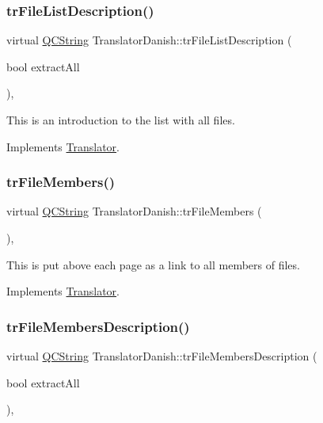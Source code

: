 \subsubsection{\texorpdfstring{trFileListDescription()}{trFileListDescription()}}
{\footnotesize\ttfamily virtual \mbox{\hyperlink{class_q_c_string}{Q\+C\+String}} Translator\+Danish\+::tr\+File\+List\+Description (\begin{DoxyParamCaption}\item[{bool}]{extract\+All }\end{DoxyParamCaption})\hspace{0.3cm}{\ttfamily [inline]}, {\ttfamily [virtual]}}

This is an introduction to the list with all files. 

Implements \mbox{\hyperlink{class_translator}{Translator}}.

\mbox{\label{class_translator_danish_a6a29a5d2185a56c12c9083d371adb616}} 
\subsubsection{\texorpdfstring{trFileMembers()}{trFileMembers()}}
{\footnotesize\ttfamily virtual \mbox{\hyperlink{class_q_c_string}{Q\+C\+String}} Translator\+Danish\+::tr\+File\+Members (\begin{DoxyParamCaption}{ }\end{DoxyParamCaption})\hspace{0.3cm}{\ttfamily [inline]}, {\ttfamily [virtual]}}

This is put above each page as a link to all members of files. 

Implements \mbox{\hyperlink{class_translator}{Translator}}.

\mbox{\label{class_translator_danish_a119a6d86a03c65d1263f7f37f296c0bd}} 
\subsubsection{\texorpdfstring{trFileMembersDescription()}{trFileMembersDescription()}}
{\footnotesize\ttfamily virtual \mbox{\hyperlink{class_q_c_string}{Q\+C\+String}} Translator\+Danish\+::tr\+File\+Members\+Description (\begin{DoxyParamCaption}\item[{bool}]{extract\+All }\end{DoxyParamCaption})\hspace{0.3cm}{\ttfamily [inline]}, {\ttfamily [virtual]}}

